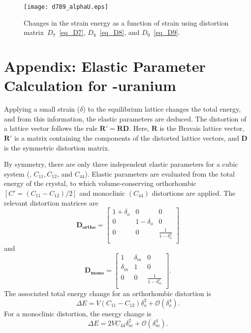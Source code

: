 \begin{figure}
	\centering
	\texttt{[image: d789\_alphaU.eps]}
	\caption{Changes in the strain energy as a function of strain using distortion matrix~$D_7$~\eqref{eq_D7}, $D_8$~\eqref{eq_D8}, and $D_9$~\eqref{eq_D9}.}
	\label{fig_D789}
\end{figure}

\clearpage
{}\label{appen_bccel}

\section*{Appendix: Elastic Parameter Calculation for \boldmath \textgamma-uranium}
Applying a small strain ($\delta$) to the equilibrium lattice changes the total energy, and from this information, the elastic parameters are deduced. The distortion of a lattice vector follows the rule $\mathbf{R'} = \mathbf{RD}$. Here, $\mathbf{R}$ is the Bravais lattice vector, $\mathbf{R'}$ is a matrix containing the components of the distorted lattice vectors, and $\mathbf{D}$ is the symmetric distortion matrix.


By symmetry, there are only three independent elastic parameters for a cubic system (\ie, $C_{11}, C_{12}$, and $ C_{44}$).
Elastic parameters are evaluated from the total energy of the crystal, to which volume-conserving orthorhombic $[C'=(C_{11} - C_{12})/2]$ and monoclinic $(C_{44})$ distortions are applied. The relevant distortion matrices are 
\begin{equation}
\mathbf{D_\text{ortho}} = \label{eq:ortho}
		\begin{bmatrix}
		1+\delta_o & 0 & 0 \\
		0 & 1-\delta_o & 0 \\
		0 & 0 & \frac{1}{1-\delta_o^2}\\
		\end{bmatrix}
\end{equation}
and
\begin{equation}
\label{eq:mono}
\mathbf{D_\text{mono}} = \begin{bmatrix}
	1 & \delta_m & 0 \\
	\delta_m & 1 & 0 \\
	0 & 0 & \frac{1}{1-\delta_m^2} \\
\end{bmatrix}.
\end{equation}
The associated total energy change for an orthorhombic distortion is 
\begin{equation}
\label{eq_ortho}
\Delta E = V(C_{11} - C_{12})\delta_o^2 + \mathcal{O}(\delta_o^4) .
\end{equation}
For a monoclinic distortion, the energy change is
\begin{equation}
\label{eq_mono}
\Delta E = 2VC_{44}\delta_m^2 + \mathcal{O}(\delta_m^4).
\end{equation}


